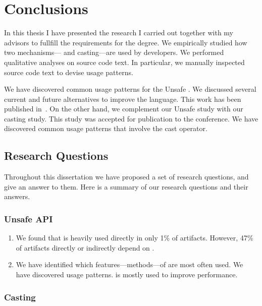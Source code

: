 \chapter{Conclusions}
\label{cha:conclusions}


In this thesis I have presented the research I carried out together with my advisors to fullfill the requirements for the \phd{} degree.
We empirically studied how two mechanisms---\unsafe{} \api{} and casting---are used by \java{} developers.
We performed qualitative analyses on source code text.
In particular, we manually inspected source code text to devise usage patterns.

We have discovered common usage patterns for the \java{} Unsafe \api{}.
We discussed several current and future alternatives to improve the
\java{} language.
This work has been published in~\citep{mastrangeloUseYourOwn2015}.
On the other hand, we complement our Unsafe \api{} study with 
our casting study.
This study was accepted for publication to the  conference.
We have discovered common usage patterns that involve the cast operator.

\section{Research Questions}

Throughout this dissertation we have proposed a set of research questions,
and give an answer to them.
Here is a summary of our research questions and their answers.

\subsection*{Unsafe API}

\begin{enumerate}[label=\ref{unsafe:rq\arabic*},leftmargin=3.4\parindent]
\item {\bf \urqA} 
We found that \smu{} is heavily used directly in only 1\% of artifacts.
However, 47\% of artifacts directly or indirectly depend on \smu{}.
\item {\bf \urqB} 
We have identified which features---methods---of \smu{} are most often used.
We have discovered \unsafe{} usage patterns.
\smu{} is mostly used to improve performance.
\end{enumerate}

\subsection*{Casting}


